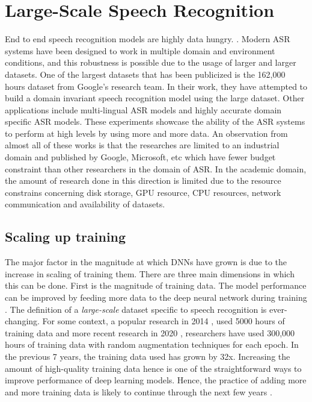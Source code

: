 \chapter{Large-Scale Speech Recognition}
\label{chapter:largescale}

End to end speech recognition models are highly data hungry. \cite{Li2020OnRecognition}. Modern ASR systems have been designed to work in multiple domain and environment conditions, and this robustness is possible due to the usage of larger and larger datasets. One of the largest datasets that has been publicized is the 162,000 hours dataset from Google's research team. In their work, they have attempted to build a domain invariant speech recognition model using the large dataset\cite{Narayanan2019TowardTraining}. Other applications include multi-lingual ASR models \cite{Kannan2019Large-ScaleModel} and highly accurate domain specific ASR models. These experiments showcase the ability of the ASR systems to perform at high levels by using more and more data. An observation from almost all of these works is that the researches are limited to an industrial domain and published by Google, Microsoft, etc which have fewer budget constraint than other researchers in the domain of ASR. In the academic domain, the amount of research done in this direction is limited due to the resource constrains concerning disk storage, GPU resource, CPU resources, network communication and availability of datasets. 

\section{Scaling up training}
The major factor in the magnitude at which DNNs have grown is due to the increase in scaling of training them. There are three main dimensions in which this can be done. First is the magnitude of training data. The model performance can be improved by feeding more data to the deep neural network during training \cite{HestnessDEEPEMPIRICALLY}. The definition of a \emph{large-scale} dataset specific to speech recognition is ever-changing. For some context, a popular research in 2014 \cite{Hannun2014DeepRecognition}, used 5000 hours of training data and more recent research in 2020 \cite{NarayananRECOGNIZINGMODELS}, researchers have used 300,000 hours of training data with random augmentation techniques for each epoch. In the previous 7 years, the training data used has grown by 32x. Increasing the amount of high-quality training data hence is one of the straightforward ways to improve performance of deep learning models. Hence, the practice of adding more and more training data is likely to continue through the next few years \cite{Mayer2020ScalableInfrastructures}. 


